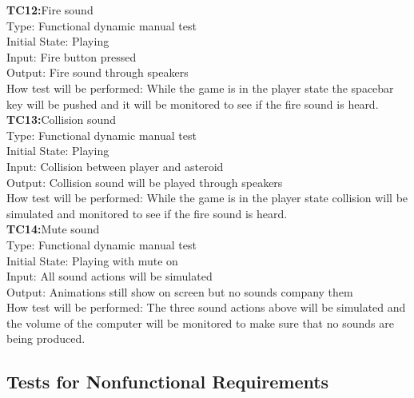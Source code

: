 \documentclass[12pt, titlepage]{article}
\begin{document}
\textbf{TC12:}Fire sound\\

Type: Functional dynamic manual test\\

Initial State: Playing\\

Input: Fire button pressed\\

Output: Fire sound through speakers\\

How test will be performed: While the game is in the player state the spacebar key will be pushed and it will be monitored to see if the fire sound is heard.\\

\textbf{TC13:}Collision sound\\

Type: Functional dynamic manual test\\

Initial State: Playing\\

Input: Collision between player and asteroid\\

Output: Collision sound will be played through speakers\\

How test will be performed: While the game is in the player state collision will be simulated and monitored to see if the fire sound is heard.\\

\textbf{TC14:}Mute sound\\

Type: Functional dynamic manual test\\

Initial State: Playing with mute on\\

Input: All sound actions will be simulated\\

Output: Animations still show on screen but no sounds company them\\

How test will be performed: The three sound actions above will be simulated and the volume of the computer will be monitored to make sure that no sounds are being produced.\\


\subsection{Tests for Nonfunctional Requirements}
\end{document}
